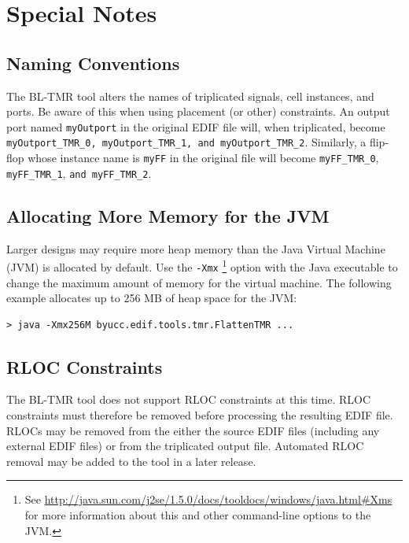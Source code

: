 \documentclass[english]{article}
\begin{document}

\section{Special Notes}

\subsection{Naming Conventions}
\label{naming conventions}
The BL-TMR tool alters the names of triplicated signals, cell instances, and 
ports. Be aware of this when using placement (or other) constraints. An output 
port named \texttt{myOutport} in the original EDIF file will, when triplicated, 
become \texttt{myOutport\_TMR\_0, myOutport\_TMR\_1, and myOutport\_TMR\_2}. 
Similarly, a flip-flop whose instance name is \texttt{myFF} in the original file
will become \texttt{myFF\_TMR\_0}, \texttt{myFF\_TMR\_1}, 
\texttt{and myFF\_TMR\_2}.

\subsection{Allocating More Memory for the JVM}
Larger designs may require more heap memory than the Java Virtual Machine (JVM) 
is allocated by default. Use the \texttt{-Xmx}
\footnote{See 
\url{http://java.sun.com/j2se/1.5.0/docs/tooldocs/windows/java.html\#Xms} 
for more information about this and other command-line options to the JVM.} 
option with the Java executable to change the maximum amount of memory for 
the virtual machine. The following example allocates up to 256 MB of 
heap space for the JVM:

\begin{verbatim}
> java -Xmx256M byucc.edif.tools.tmr.FlattenTMR ...
\end{verbatim}

\subsection{RLOC Constraints}
The BL-TMR tool does not support RLOC constraints at this time. RLOC constraints 
must therefore be removed before processing the resulting EDIF file. RLOCs may 
be removed from the either the source EDIF files (including any external EDIF 
files) or from the triplicated output file. Automated RLOC removal may be added 
to the tool in a later release.
\end{document}
